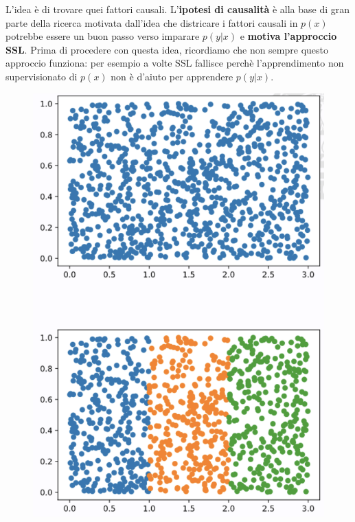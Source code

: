 L'idea è di trovare quei fattori causali. 
\newline
\newline
L'\textbf{ipotesi di causalità} è alla base di gran parte della ricerca motivata dall'idea che districare 
i fattori causali in $p(x)$ potrebbe essere un buon passo verso imparare $p(y|x)$ e \textbf{motiva l'approccio
SSL}.
\newline
\newline
Prima di procedere con questa idea, ricordiamo che non sempre questo approccio funziona: per esempio
a volte SSL fallisce perchè l'apprendimento non supervisionato di $p(x)$ non è d'aiuto per apprendere $p(y|x)$.
\begin{figure}[!h]
  \includegraphics[scale=.3]{images/representation_learning/failure.png}
  \centering
\end{figure}


